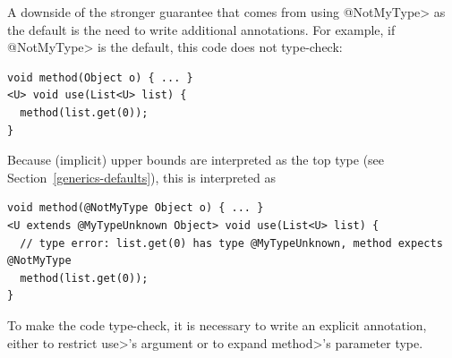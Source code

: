 A downside of the stronger guarantee that comes from using \<@NotMyType> as
the default is the need to write additional annotations.
For example, if \<@NotMyType> is the default, this code does not type-check:

\begin{Verbatim}
void method(Object o) { ... }
<U> void use(List<U> list) {
  method(list.get(0));
}
\end{Verbatim}

Because (implicit) upper bounds are interpreted as the top type (see
Section~\ref{generics-defaults}), this is interpreted as

\begin{Verbatim}
void method(@NotMyType Object o) { ... }
<U extends @MyTypeUnknown Object> void use(List<U> list) {
  // type error: list.get(0) has type @MyTypeUnknown, method expects @NotMyType
  method(list.get(0));
}
\end{Verbatim}

To make the code type-check, it is necessary to write an explicit
annotation, either to restrict \<use>'s argument or to expand \<method>'s
parameter type.




